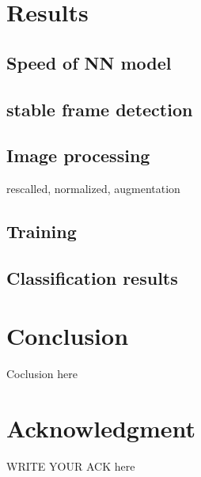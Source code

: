 \documentclass[journal,onecolumn,12pt]{IEEEtran}
\begin{document}
\section{Results}

\subsection{Speed of NN model}

\subsection{stable frame detection}

\subsection{Image processing}
rescalled, normalized, augmentation

\subsection{Training}

\subsection{Classification results}

\section{Conclusion}
Coclusion here

\section*{Acknowledgment}
WRITE YOUR ACK here

\end{document}
